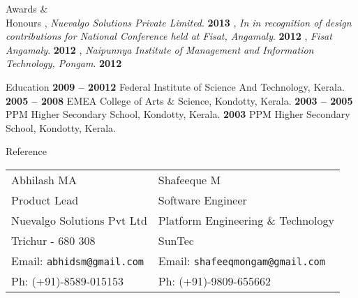 \documentclass{resume}
\begin{document}

\begin{category}{Awards \&\\ Honours}
  , {\em Nuevalgo Solutions Private Limited}. \hfill \textbf{2013}
  , {\em  In in recognition of design contributions for National Conference held at Fisat, Angamaly}. \hfill \textbf{2012}
  , {\em Fisat Angamaly}. \hfill \textbf{2012}
  , {\em  Naipunnya  Institute  of  Management  and  Information  Technology, Pongam}. \hfill \textbf{2012}
\end{category}


\begin{category}{Education}
   \hfill \textbf{2009 -- 20012}
  \citemnobullet Federal Institute of Science And Technology, Kerala.
   \hfill \textbf{2005 -- 2008}
  \citemnobullet  EMEA College of Arts \& Science, Kondotty, Kerala.
   \hfill \textbf{2003 -- 2005}
  \citemnobullet PPM Higher Secondary School, Kondotty, Kerala.
   \hfill \textbf{2003}
  \citemnobullet PPM Higher Secondary School, Kondotty, Kerala.\end{category}
  



\begin{category}{Reference}
  \citemnobullet \\
  \begin{tabular}{ll}Abhilash MA&Shafeeque M\\
    Product Lead&Software Engineer\\
    Nuevalgo Solutions Pvt Ltd&Platform Engineering \& Technology\\
    Trichur -  680 308&SunTec\\
    Email: \mbox{\small\tt abhidsm@gmail.com}&Email: \mbox{\small\tt shafeeqmongam@gmail.com}\\
    Ph: (+91)-8589-015153&Ph: (+91)-9809-655662
  \end{tabular}
\end{category}
\end{document}
